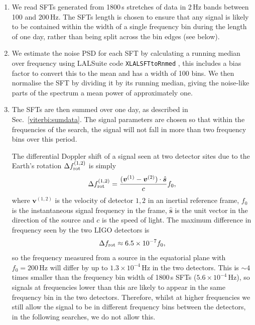 \begin{enumerate}
%
\item We read \acp{SFT} generated from 1800\,s stretches of data in 2\,Hz
    bands between 100 and 200\,Hz. The \acp{SFT} length is chosen to ensure that any signal is likely to be contained within the width of a single
    frequency bin during the length of one day, rather than being split
    across the bin edges (see below).
%
\item We estimate the noise \ac{PSD} for each \ac{SFT} by calculating a
    running median over frequency using LALSuite
    code {\tt XLALSFTtoRnmed} \citep{ligoscientificcollaboration2018LIGOAlgorithm}, this includes a bias factor to
    convert this to the mean and has a width of 100 bins. We then normalise the \ac{SFT} by dividing it
    by its running median, giving the noise-like parts of the spectrum a
    mean power of approximately one.

\item The \acp{SFT} are then summed over one day, as described in
    Sec.~\ref{viterbi:sumdata}. The signal parameters are chosen so that
    within the frequencies of the search, the signal will not fall in more than two frequency bins over this
    period.

    The differential Doppler shift of a signal seen at two detector sites due to the Earth's rotation $\Delta f^{(1,2)}_{\rm{rot}}$ is simply
%
\begin{equation} \label{results:doppler}
\Delta f^{(1,2)}_{\rm{rot}} = \frac{({{\bm v}^{(1)}} -{{\bm v}^{(2)}})\cdot
\hat{\bm s}}{c} f_0,
\end{equation}
%
where ${\bm v}^{(1,2)}$ is the velocity of detector $1,2$ in an inertial reference frame, $f_0$ is the
instantaneous signal frequency in the frame, $\hat{\bm s}$ is the unit vector in the direction of the source and  $c$ is the speed of light.
The maximum difference in frequency seen by the two \ac{LIGO} detectors
is 
\begin{equation} \label{results:doppler:diff}
\Delta f_{\rm rot} \approx 6.5\times 10^{-7} f_0,
\end{equation}
%
so the frequency measured from a source in the equatorial plane with $f_0=200$\,Hz will differ by up to $1.3 \times 10^{-4}$\,Hz in the two detectors.
This is $\sim 4$ times smaller than the frequency bin width of 1800\,s \acp{SFT} ($5.6 \times
10^{-4}$\,Hz), so signals at frequencies lower than this are likely to appear in the same frequency bin in the two detectors. Therefore, whilst at higher frequencies we still allow the signal to be in different frequency bins between the detectors, in the following searches, we do not allow this.
%


\end{enumerate}
